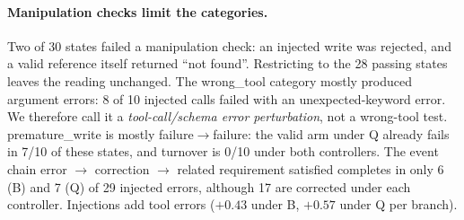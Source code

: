 \paragraph{Manipulation checks limit the categories.} Two of 30 states failed a manipulation check: an injected write was rejected, and a valid reference itself returned ``not found''. Restricting to the 28 passing states leaves the reading unchanged. The wrong\_tool category mostly produced argument errors: 8 of 10 injected calls failed with an unexpected-keyword error. We therefore call it a \emph{tool-call/schema error perturbation}, not a wrong-tool test. premature\_write is mostly failure$\rightarrow$failure: the valid arm under Q already fails in 7/10 of these states, and turnover is 0/10 under both controllers. %
The event chain error $\rightarrow$ correction $\rightarrow$ related requirement satisfied completes in only 6 (B) and 7 (Q) of 29 injected errors, although 17 are corrected under each controller. Injections add tool errors ($+0.43$ under B, $+0.57$ under Q per branch). %

